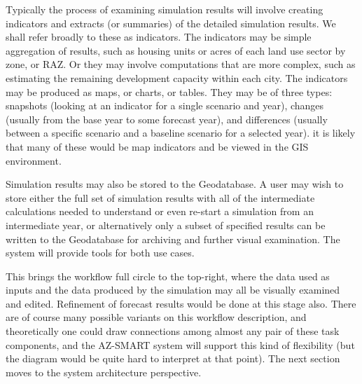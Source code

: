 \documentclass[titlepage]{article}
\begin{document}
Typically the process of examining simulation results will involve creating indicators and extracts (or summaries) of the detailed simulation results.  We shall refer broadly to these as indicators.  The indicators may be simple aggregation of results, such as housing units or acres of each land use sector by zone, or RAZ.  Or they may involve computations that are more complex, such as estimating the remaining development capacity within each city.  The indicators may be produced as maps, or charts, or tables.  They may be of three types: snapshots (looking at an indicator for a single scenario and year), changes (usually from the base year to some forecast year), and differences (usually between a specific scenario and a baseline scenario for a selected year).  it is likely that many of these would be map indicators and be viewed in the GIS environment.

Simulation results may also be stored to the Geodatabase.  A user may wish to store either the full set of simulation results with all of the intermediate calculations needed to understand or even re-start a simulation from an intermediate year, or alternatively only a subset of specified results can be written to the Geodatabase for archiving and further visual examination.  The system will provide tools for both use cases.

This brings the workflow full circle to the top-right, where the data used as inputs and the data produced by the simulation may all be visually examined and edited.  Refinement of forecast results would be done at this stage also.  There are of course many possible variants on this workflow description, and theoretically one could draw connections among almost any pair of these task components, and the AZ-SMART system will support this kind of flexibility (but the diagram would be quite hard to interpret at that point).  The next section moves to the system architecture perspective.
\end{document}
